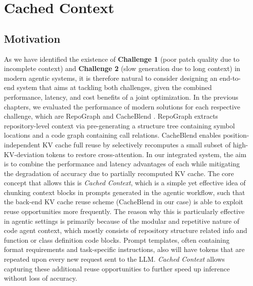 \chapter{Cached Context}
\label{cha:ch3}


\section{Motivation}
\label{sec:ch3_intro}

As we have identified the existence of \textbf{Challenge 1} (poor patch quality due to incomplete context) and \textbf{Challenge 2} (slow generation due to long context) in modern agentic systems, it is therefore natural to consider designing an end-to-end system that aims at tackling both challenges, given the combined performance, latency, and cost benefits of a joint optimization. In the previous chapters, we evaluated the performance of modern solutions for each respective challenge, which are RepoGraph \cite{ouyang2025repographenhancingaisoftware} and CacheBlend \cite{yao2025cacheblendfastlargelanguage}. RepoGraph extracts repository-level context via pre-generating a structure tree containing symbol locations and a code graph containing call relations. CacheBlend enables position-independent KV cache full reuse by selectively recomputes a small subset of high-KV-deviation tokens to restore cross-attention. { In our integrated system, the aim is to combine the performance and latency advantages of each while mitigating the degradation of accuracy due to partially recomputed KV cache. The core concept that allows this is \textit{Cached Context}, which is a simple yet effective idea of chunking context blocks in prompts generated in the agentic workflow, such that the back-end KV cache reuse scheme (CacheBlend in our case) is able to exploit reuse opportunities more frequently. The reason why this is particularly effective in agentic settings is primarily because of the modular and repetitive nature of code agent context, which mostly consists of repository structure related info and function or class definition code blocks. Prompt templates, often containing format requirements and task-specific instructions, also will have tokens that are repeated upon every new request sent to the LLM. \textit{Cached Context} allows capturing these additional reuse opportunities to further speed up inference without loss of accuracy.}